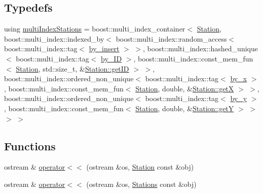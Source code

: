 \subsection*{Typedefs}
\begin{DoxyCompactItemize}
\item 
using \mbox{\hyperlink{namespaceanen_sta_a36826977aea7dbb351b814cceb511330}{multi\+Index\+Stations}} = boost\+::multi\+\_\+index\+\_\+container$<$ \mbox{\hyperlink{classanen_sta_1_1_station}{Station}}, boost\+::multi\+\_\+index\+::indexed\+\_\+by$<$ boost\+::multi\+\_\+index\+::random\+\_\+access$<$ boost\+::multi\+\_\+index\+::tag$<$ \mbox{\hyperlink{structanen_sta_1_1by__insert}{by\+\_\+insert}} $>$ $>$, boost\+::multi\+\_\+index\+::hashed\+\_\+unique$<$ boost\+::multi\+\_\+index\+::tag$<$ \mbox{\hyperlink{structanen_sta_1_1by___i_d}{by\+\_\+\+ID}} $>$, boost\+::multi\+\_\+index\+::const\+\_\+mem\+\_\+fun$<$ \mbox{\hyperlink{classanen_sta_1_1_station}{Station}}, std\+::size\+\_\+t, \&\mbox{\hyperlink{classanen_sta_1_1_station_a7da5e30ee0d25653333630aa61ca5257}{Station\+::get\+ID}} $>$ $>$, boost\+::multi\+\_\+index\+::ordered\+\_\+non\+\_\+unique$<$ boost\+::multi\+\_\+index\+::tag$<$ \mbox{\hyperlink{structanen_sta_1_1by__x}{by\+\_\+x}} $>$, boost\+::multi\+\_\+index\+::const\+\_\+mem\+\_\+fun$<$ \mbox{\hyperlink{classanen_sta_1_1_station}{Station}}, double, \&\mbox{\hyperlink{classanen_sta_1_1_station_a8f4b152659b571ef4d14159527d2037d}{Station\+::getX}} $>$ $>$, boost\+::multi\+\_\+index\+::ordered\+\_\+non\+\_\+unique$<$ boost\+::multi\+\_\+index\+::tag$<$ \mbox{\hyperlink{structanen_sta_1_1by__y}{by\+\_\+y}} $>$, boost\+::multi\+\_\+index\+::const\+\_\+mem\+\_\+fun$<$ \mbox{\hyperlink{classanen_sta_1_1_station}{Station}}, double, \&\mbox{\hyperlink{classanen_sta_1_1_station_adefc7f1b643ef4542580fd05fbf96b60}{Station\+::getY}} $>$ $>$ $>$ $>$
\end{DoxyCompactItemize}
\subsection*{Functions}
\begin{DoxyCompactItemize}
\item 
ostream \& \mbox{\hyperlink{namespaceanen_sta_abbe68650f0c5b4173991ed2220b3143f}{operator$<$$<$}} (ostream \&os, \mbox{\hyperlink{classanen_sta_1_1_station}{Station}} const \&obj)
\item 
ostream \& \mbox{\hyperlink{namespaceanen_sta_a08ae85128c31bfbd2999f821d7605eeb}{operator$<$$<$}} (ostream \&os, \mbox{\hyperlink{classanen_sta_1_1_stations}{Stations}} const \&obj)
\end{DoxyCompactItemize}


